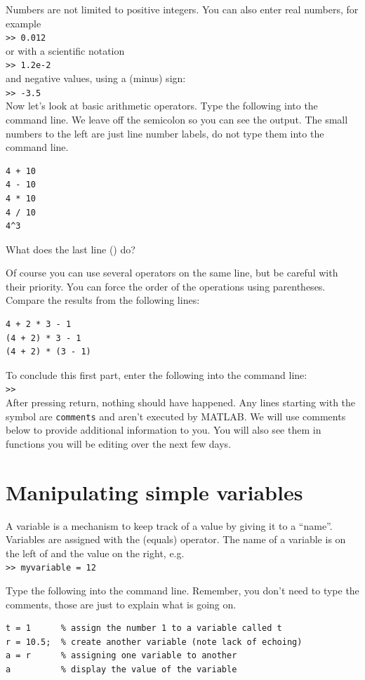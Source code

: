 \documentclass{article}
\begin{document}
Numbers are not limited to positive integers.
You can also enter real numbers, for example \\
\verb|>> 0.012| \\
or with a scientific notation \\
\verb|>> 1.2e-2| \\
and negative values, using a \mcode{-} (minus) sign:\\
\verb|>> -3.5| \\

Now let's look at basic arithmetic operators.
Type the following into the command line. 
We leave off the semicolon so you can see the output. 
The small numbers to the left are just line number labels, do not type them into the command line. 

\begin{lstlisting}
4 + 10
4 - 10
4 * 10
4 / 10
4^3
\end{lstlisting}
What does the last line () do?

Of course you can use several operators on the same line, but be careful with their priority.
You can force the order of the operations using parentheses.
Compare the results from the following lines:
\begin{lstlisting}
4 + 2 * 3 - 1
(4 + 2) * 3 - 1
(4 + 2) * (3 - 1)
\end{lstlisting}

To conclude this first part, enter the following into the command line: \\
\verb|>>|  \\
After pressing return, nothing should have happened.
Any lines starting with the \mcode{\%} symbol are \verb|comments| and aren't executed by MATLAB.
We will use comments below to provide additional information to you.
You will also see them in functions you will be editing over the next few days.


\section{Manipulating simple variables}

A variable is a mechanism to keep track of a value by giving it to a ``name''.
Variables are assigned with the \mcode{=} (equals) operator.
The name of a variable is on the left of \mcode{=} and the value on the right, e.g.\\
\verb|>> myvariable = 12|

Type the following into the command line.
Remember, you don't need to type the comments, those are just to explain what is going on.
\begin{lstlisting}
t = 1      % assign the number 1 to a variable called t
r = 10.5;  % create another variable (note lack of echoing)
a = r      % assigning one variable to another
a          % display the value of the variable
\end{lstlisting}
\end{document}
